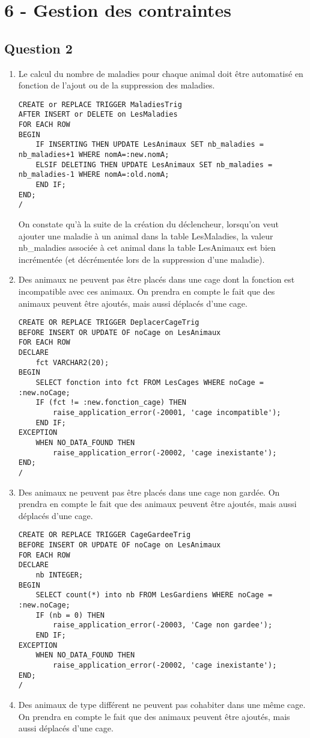 \documentclass{article}
\begin{document}
\section*{6 - Gestion des contraintes}
\subsection*{Question 2}
\begin{enumerate}[label=\arabic*)]
	\item Le calcul du nombre de maladies pour chaque animal doit être automatisé en fonction de l’ajout
ou de la suppression des maladies.

\lstset{language=SQL}
\begin{lstlisting}
CREATE or REPLACE TRIGGER MaladiesTrig
AFTER INSERT or DELETE on LesMaladies
FOR EACH ROW
BEGIN
	IF INSERTING THEN UPDATE LesAnimaux SET nb_maladies = nb_maladies+1 WHERE nomA=:new.nomA;
	ELSIF DELETING THEN UPDATE LesAnimaux SET nb_maladies = nb_maladies-1 WHERE nomA=:old.nomA;
	END IF;
END;
/
\end{lstlisting}

On constate qu'à la suite de la création du déclencheur, lorsqu'on veut ajouter une maladie à un animal dans la table LesMaladies, la valeur nb\_maladies associée à cet animal dans la table LesAnimaux est bien incrémentée (et décrémentée lors de la suppression d'une maladie).

	\item Des animaux ne peuvent pas être placés dans une cage dont la fonction est incompatible avec
ces animaux. On prendra en compte le fait que des animaux peuvent être ajoutés, mais aussi
déplacés d’une cage.

\begin{lstlisting}
CREATE OR REPLACE TRIGGER DeplacerCageTrig
BEFORE INSERT OR UPDATE OF noCage on LesAnimaux
FOR EACH ROW
DECLARE
	fct VARCHAR2(20);
BEGIN
	SELECT fonction into fct FROM LesCages WHERE noCage = :new.noCage;
	IF (fct != :new.fonction_cage) THEN
		raise_application_error(-20001, 'cage incompatible');
	END IF;
EXCEPTION 
	WHEN NO_DATA_FOUND THEN
		raise_application_error(-20002, 'cage inexistante');
END;
/
\end{lstlisting}
	\item Des animaux ne peuvent pas être placés dans une cage non gardée. On prendra en compte le
fait que des animaux peuvent être ajoutés, mais aussi déplacés d’une cage.

\begin{lstlisting}
CREATE OR REPLACE TRIGGER CageGardeeTrig
BEFORE INSERT OR UPDATE OF noCage on LesAnimaux
FOR EACH ROW
DECLARE
	nb INTEGER;
BEGIN
	SELECT count(*) into nb FROM LesGardiens WHERE noCage = :new.noCage;
	IF (nb = 0) THEN
		raise_application_error(-20003, 'Cage non gardee');
	END IF;
EXCEPTION 
	WHEN NO_DATA_FOUND THEN
		raise_application_error(-20002, 'cage inexistante');
END;
/
\end{lstlisting}
	\item Des animaux de type différent ne peuvent pas cohabiter dans une même cage. On prendra en
compte le fait que des animaux peuvent être ajoutés, mais aussi déplacés d’une cage.
\end{enumerate}
\end{document}
